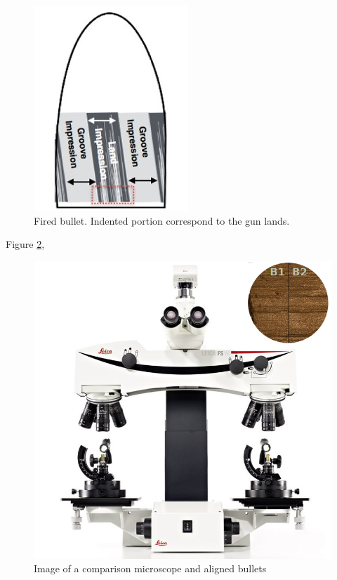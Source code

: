 \documentclass[print]{nuthesis}
\begin{document}
\begin{figure}

{\centering \includegraphics[width=0.5\linewidth]{images/bulletland} 

}

\caption{Fired bullet. Indented portion correspond to the gun lands.}\label{fig:firedland}
\end{figure}

 Figure \ref{fig:microscope}, 

\begin{figure}

{\centering \includegraphics[width=0.5\linewidth]{images/microscope} 

}

\caption{Image of a comparison microscope and aligned bullets}\label{fig:microscope}
\end{figure}
\end{document}
